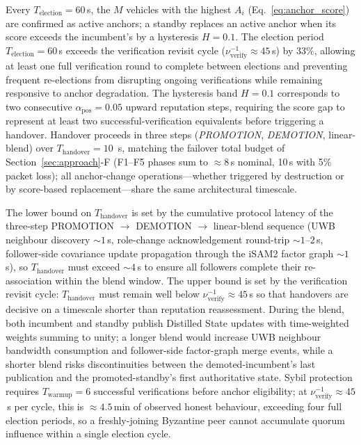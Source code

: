\documentclass[journal,10pt,twocolumn]{IEEEtran}
\begin{document}
Every $T_\text{election} = 60$\,s, the $M$ vehicles with the highest $A_i$ (Eq.~\ref{eq:anchor_score}) are confirmed as active anchors; a standby replaces an active anchor when its score exceeds the incumbent's by a hysteresis $H = 0.1$. The election period $T_\text{election}=60$\,s exceeds the verification revisit cycle ($\nu_\text{verify}^{-1}\approx 45$\,s) by 33\%, allowing at least one full verification round to complete between elections and preventing frequent re-elections from disrupting ongoing verifications while remaining responsive to anchor degradation. The hysteresis band $H=0.1$ corresponds to two consecutive $\alpha_\text{pos}=0.05$ upward reputation steps, requiring the score gap to represent at least two successful-verification equivalents before triggering a handover. Handover proceeds in three steps (\emph{PROMOTION}, \emph{DEMOTION}, linear-blend) over $T_\text{handover} = 10$~s, matching the failover total budget of Section~\ref{sec:approach}-F (F1--F5 phases sum to $\approx 8$\,s nominal, 10\,s with 5\% packet loss); all anchor-change operations---whether triggered by destruction or by score-based replacement---share the same architectural timescale.

The lower bound on $T_\text{handover}$ is set by the cumulative protocol latency of the three-step PROMOTION $\to$ DEMOTION $\to$ linear-blend sequence (UWB neighbour discovery $\sim 1$\,s, role-change acknowledgement round-trip $\sim 1$--$2$\,s, follower-side covariance update propagation through the iSAM2 factor graph $\sim 1$\,s), so $T_\text{handover}$ must exceed $\sim 4$\,s to ensure all followers complete their re-association within the blend window. The upper bound is set by the verification revisit cycle: $T_\text{handover}$ must remain well below $\nu_\text{verify}^{-1}\approx 45$\,s so that handovers are decisive on a timescale shorter than reputation reassessment. During the blend, both incumbent and standby publish Distilled State updates with time-weighted weights summing to unity; a longer blend would increase UWB neighbour bandwidth consumption and follower-side factor-graph merge events, while a shorter blend risks discontinuities between the demoted-incumbent's last publication and the promoted-standby's first authoritative state. Sybil protection requires $T_\text{warmup} = 6$ successful verifications before anchor eligibility; at $\nu_\text{verify}^{-1}\approx 45$\,s per cycle, this is $\approx 4.5$\,min of observed honest behaviour, exceeding four full election periods, so a freshly-joining Byzantine peer cannot accumulate quorum influence within a single election cycle.
\end{document}

